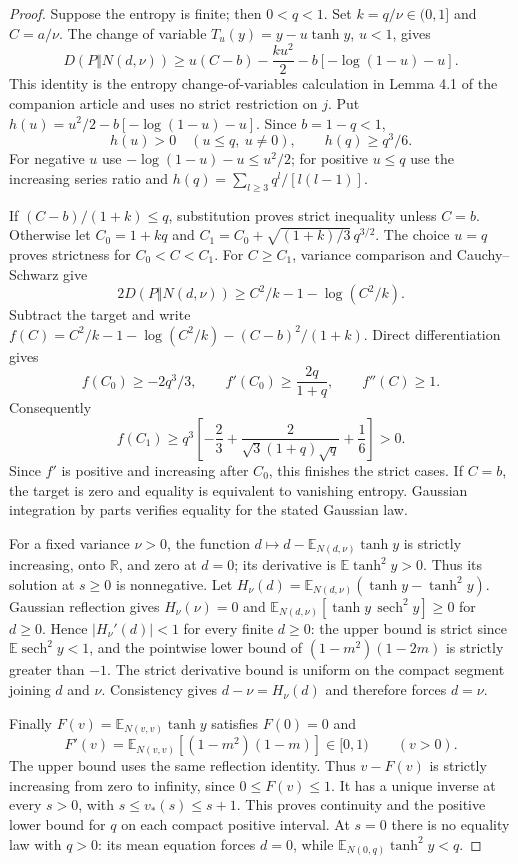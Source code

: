 \begin{proof}
Suppose the entropy is finite; then $0<q<1$.  Set
$k=q/\nu\in(0,1]$ and $C=a/\nu$.  The change of variable
$T_u(y)=y-u\tanh y$, $u<1$, gives
\[
 D(P\Vert N(d,\nu))
 \ge u(C-b)-\frac{k u^2}{2}-b[-\log(1-u)-u].
\]
This identity is the entropy change-of-variables calculation in
Lemma 4.1 of the companion article and uses no strict restriction on
$j$.  Put $h(u)=u^2/2-b[-\log(1-u)-u]$.  Since $b=1-q<1$,
\[
 h(u)>0\quad(u\le q,\ u\ne0),\qquad h(q)\ge q^3/6.
\]
For negative $u$ use $-\log(1-u)-u\le u^2/2$; for positive $u\le q$
use the increasing series ratio and
$h(q)=\sum_{l\ge3}q^l/[l(l-1)]$.

If $(C-b)/(1+k)\le q$, substitution proves strict inequality unless
$C=b$.  Otherwise let $C_0=1+kq$ and
$C_1=C_0+\sqrt{(1+k)/3}\,q^{3/2}$.  The choice $u=q$ proves strictness
for $C_0<C<C_1$.  For $C\ge C_1$, variance comparison and
Cauchy--Schwarz give
\[
 2D(P\Vert N(d,\nu))\ge C^2/k-1-\log(C^2/k).
\]
Subtract the target and write
$f(C)=C^2/k-1-\log(C^2/k)-(C-b)^2/(1+k)$.  Direct differentiation gives
\[
 f(C_0)\ge-2q^3/3,\qquad
 f'(C_0)\ge\frac{2q}{1+q},\qquad f''(C)\ge1.
\]
Consequently
\[
 f(C_1)\ge q^3\left[-\frac23+
       \frac{2}{\sqrt3(1+q)\sqrt q}+\frac16\right]>0.
\]
Since $f'$ is positive and increasing after $C_0$, this finishes the
strict cases.  If $C=b$, the target is zero and equality is equivalent
to vanishing entropy.  Gaussian integration by parts verifies equality
for the stated Gaussian law.

For a fixed variance $\nu>0$, the function
$d\mapsto d-\mathbb E_{N(d,\nu)}\tanh y$ is strictly increasing,
onto $\mathbb R$, and zero at $d=0$; its derivative is
$\mathbb E\tanh^2y>0$.  Thus its solution at $s\ge0$ is nonnegative.
Let $H_\nu(d)=\mathbb E_{N(d,\nu)}(\tanh y-\tanh^2y)$.
Gaussian reflection gives $H_\nu(\nu)=0$ and
$\mathbb E_{N(d,\nu)}[\tanh y\,\operatorname{sech}^2y]\ge0$ for $d\ge0$.
Hence $|H_\nu'(d)|<1$ for every finite $d\ge0$: the upper bound is
strict since $\mathbb E\operatorname{sech}^2y<1$, and the pointwise
lower bound of $(1-m^2)(1-2m)$ is strictly greater than $-1$.
The strict derivative bound is uniform on the compact segment joining
$d$ and $\nu$.  Consistency gives $d-\nu=H_\nu(d)$ and therefore forces
$d=\nu$.

Finally $F(v)=\mathbb E_{N(v,v)}\tanh y$ satisfies $F(0)=0$ and
\[
 F'(v)=\mathbb E_{N(v,v)}[(1-m^2)(1-m)]\in[0,1)
 \qquad(v>0).
\]
The upper bound uses the same reflection identity.  Thus $v-F(v)$
is strictly increasing from zero to infinity, since $0\le F(v)\le1$.
It has a unique inverse at every $s>0$, with $s\le v_*(s)\le s+1$.
This proves continuity and the positive lower bound for $q$ on each
compact positive interval.  At $s=0$ there is no equality law with
$q>0$: its mean equation forces $d=0$, while
$\mathbb E_{N(0,q)}\tanh^2 y<q$.


\end{proof}
